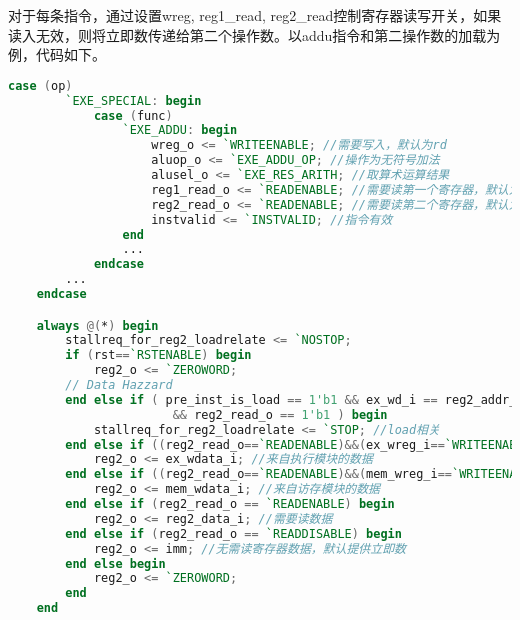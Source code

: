    对于每条指令，通过设置wreg, reg1\_read, reg2\_read控制寄存器读写开关，如果读入无效，则将立即数传递给第二个操作数。以addu指令和第二操作数的加载为例，代码如下。
    \begin{lstlisting}[language=Verilog]
    case (op) 
        `EXE_SPECIAL: begin
            case (func)
                `EXE_ADDU: begin
                    wreg_o <= `WRITEENABLE; //需要写入，默认为rd
                    aluop_o <= `EXE_ADDU_OP; //操作为无符号加法
                    alusel_o <= `EXE_RES_ARITH; //取算术运算结果
                    reg1_read_o <= `READENABLE; //需要读第一个寄存器，默认为rs
                    reg2_read_o <= `READENABLE; //需要读第二个寄存器，默认为rt
                    instvalid <= `INSTVALID; //指令有效
                end
                ...
            endcase
        ...
    endcase

    always @(*) begin
        stallreq_for_reg2_loadrelate <= `NOSTOP;
        if (rst==`RSTENABLE) begin
            reg2_o <= `ZEROWORD;
        // Data Hazzard
        end else if ( pre_inst_is_load == 1'b1 && ex_wd_i == reg2_addr_o
                       && reg2_read_o == 1'b1 ) begin
            stallreq_for_reg2_loadrelate <= `STOP; //load相关
        end else if ((reg2_read_o==`READENABLE)&&(ex_wreg_i==`WRITEENABLE)&&       (ex_wd_i==reg2_addr_o)) begin
            reg2_o <= ex_wdata_i; //来自执行模块的数据
        end else if ((reg2_read_o==`READENABLE)&&(mem_wreg_i==`WRITEENABLE)&&      (mem_wd_i==reg2_addr_o)) begin
            reg2_o <= mem_wdata_i; //来自访存模块的数据
        end else if (reg2_read_o == `READENABLE) begin
            reg2_o <= reg2_data_i; //需要读数据
        end else if (reg2_read_o == `READDISABLE) begin
            reg2_o <= imm; //无需读寄存器数据，默认提供立即数
        end else begin
            reg2_o <= `ZEROWORD;
        end 
    end
    \end{lstlisting}

